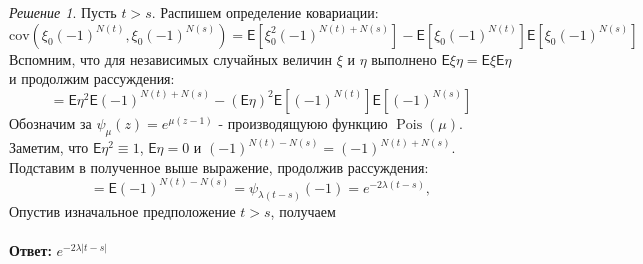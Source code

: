 \documentclass[a4paper]{article}
\newcommand{\Expect}{\mathsf{E}}
\DeclareMathOperator{\Pois}{\mathrm Pois}
\theoremstyle{plain}
\theoremstyle{definition}
\theoremstyle{remark}
\theoremstyle{nonumberplain}
\theoremstyle{nonumberplain}
\newtheorem{solution}{Решение}
\begin{document}
\begin{solution}
  Пусть $t > s$. Распишем определение ковариации:
  \begin{equation*}
    \text{cov}\left(\xi_0(-1)^{N(t)},\xi_0(-1)^{N(s)}\right) = \Expect \left[\xi_0^2 (-1)^{N(t)+N(s)}\right] - \mathsf{E}\left[\xi_0(-1)^{N(t)} \right]\Expect \left[\xi_0(-1)^{N(s)}\right]
  \end{equation*}
   Вспомним, что для независимых случайных величин $\xi$ и $\eta$ выполнено $\Expect\xi\eta = \Expect\xi\Expect\eta$ и продолжим рассуждения:
    \begin{equation*}
      =   \Expect\eta^2 \mathsf{E}(-1)^{N(t)+N(s)} - \left(\mathsf{E}\eta\right)^2 \Expect\left[(-1)^{N(t)}\right] \Expect \left[ (-1)^{N(s)} \right]
    \end{equation*}
    Обозначим за $\psi_\mu(z) = e^{\mu(z-1)}$ - производящуюю функцию $\Pois(\mu)$. Заметим, что $\mathsf{E}\eta^2 \equiv 1$, $\mathsf{E}\eta = 0$ и $(-1)^{N(t)-N(s)} = (-1)^{N(t)+N(s)}$. Подставим в полученное выше выражение, продолжив рассуждения:
    \begin{equation*}
      = \Expect(-1)^{N(t)-N(s)} = \psi_{\lambda(t-s)}(-1) = e^{-2\lambda(t-s)},
    \end{equation*}
    Опустив изначальное предположение $t > s$, получаем
    \\
    \\
    \textbf{Ответ:} $e^{-2\lambda|t-s|}$
\end{solution}

\clearpage
{}
{}
\printindex
\end{document}
